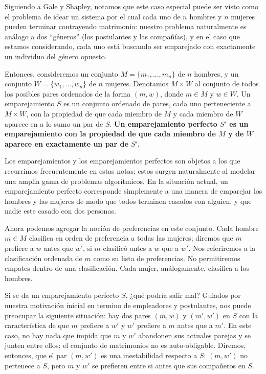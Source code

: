 \documentclass[a4paper, 12pt]{book}
\begin{document}
Siguiendo a Gale y Shapley, notamos que este caso especial puede ser visto como el problema de idear un sistema por el cual cada uno de $n$ hombres y $n$ mujeres pueden terminar contrayendo matrimonio: nuestro problema naturalmente es análogo a dos ``géneros'' (los postulantes y las compañías), y en el caso que estamos considerando, cada uno está buscando ser emparejado con exactamente un individuo del género opuesto.

Entonces, consideremos un conjunto $M =\{m_1, ...,m_n\}$ de $n$ hombres, y un conjunto  $W =\{w_1, ...,w_n\}$ de $n$ mujeres. Denotamos $M \times W$ al conjunto de todos los posibles pares ordenados de la forma $(m, w)$, donde $m \in M$ y  $w \in W $. Un emparejamiento $S$ es un conjunto ordenado de pares, cada uno perteneciente a $M \times W$, con la propiedad de que cada miembro de $M$ y cada miembro de $W$ aparece en a lo sumo un par de $S$. \textbf{Un emparejamiento perfecto $S'$ es un emparejamiento con la propiedad de que cada miembro de $M$ y de $W$ aparece en exactamente un par de $S'$.}
 
Los emparejamientos y los emparejamientos perfectos son objetos a los que recurrimos frecuentemente en estas notas; estos surgen naturalmente al modelar una amplia gama de problemas algorítmicos. En la situación actual, un emparejamiento perfecto corresponde simplemente a una manera de emparejar los hombres y las mujeres de modo que todos terminen casados con alguien, y que nadie este casado con dos personas.

Ahora podemos agregar la noción de preferencias en este conjunto. Cada hombre $m \in M$  clasifica en orden de preferencia a todas las mujeres; diremos que $m$ prefiere a $w$ antes que $w'$, si $m$ clasificó antes a $w$ que a $w'$. Nos referiremos a la clasificación ordenada de $m$ como su lista de preferencias. No permitiremos empates dentro de una clasificación. Cada mujer, análogamente, clasifica a los hombres. 

Si se da un emparejamiento perfecto $S$, ¿qué podría salir mal? Guiados por nuestra motivación inicial en termino de empleadores y postulantes, nos puede preocupar la siguiente situación: hay dos pares $(m, w)$ y $(m', w')$ en $S$ con la característica de que $m$ prefiere a $w'$ y $w'$ prefiere a $m$ antes que a $m'$. En este caso, no hay nada que impida que $m$ y $w'$ abandonen sus actuales parejas y se junten entre ellos; el conjunto de matrimonios no es auto-obligable. Diremos, entonces, que el par $(m,w')$ es una inestabilidad respecto a $S$: $(m,w')$ no pertenece a $S$, pero $m$ y $w'$ se prefieren entre si antes que sus compañeros en $S$. 
   
\end{document}
